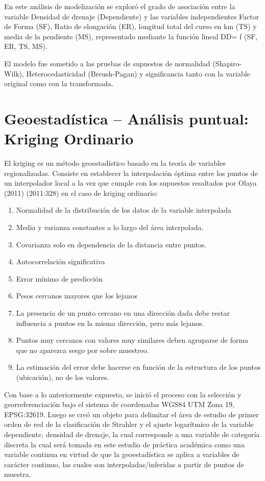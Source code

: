 \documentclass[11pt,]{article}
\providecommand{\tightlist}{%
\setlength{\itemsep}{0pt}\setlength{\parskip}{0pt}}
\begin{document}
En este análisis de modelización se exploró el grado de asociación entre
la variable Densidad de drenaje (Dependiente) y las variables
independientes Factor de Forma (SF), Ratio de elongación (ER), longitud
total del curso en km (TS) y media de la pendiente (MS), representado
mediante la función lineal DD= f (SF, ER, TS, MS).

El modelo fue sometido a las pruebas de supuestos de normalidad
(Shapiro-Wilk), Heterocedasticidad (Breush-Pagan) y significancia tanto
con la variable original como con la transformada.

\section{Geoestadística -- Análisis puntual: Kriging
Ordinario}\label{geoestaduxedstica-anuxe1lisis-puntual-kriging-ordinario}

El kriging es un método geoestadístico basado en la teoría de variables
regionalizadas. Consiste en establecer la interpolación óptima entre los
puntos de un interpolador local a la vez que cumple con los supuestos
resaltados por Olaya (2011) (2011:328) en el caso de kriging ordinario:

\begin{enumerate}
\def\labelenumi{\arabic{enumi}.}
\tightlist
\item
  Normalidad de la distribución de los datos de la variable interpolada
\item
  Media y varianza constantes a lo largo del área interpolada.
\item
  Covarianza solo en dependencia de la distancia entre puntos.
\item
  Autocorrelación significativa
\item
  Error mínimo de predicción
\item
  Pesos cercanos mayores que los lejanos
\item
  La presencia de un punto cercano en una dirección dada debe restar
  influencia a puntos en la misma dirección, pero más lejanos.
\item
  Puntos muy cercanos con valores muy similares deben agruparse de forma
  que no aparezca sesgo por sobre muestreo.
\item
  La estimación del error debe hacerse en función de la estructura de
  los puntos (ubicación), no de los valores.
\end{enumerate}

Con base a lo anteriormente expuesto, se inició el proceso con la
selección y georreferenciación bajo el sistema de coordenadas WGS84 UTM
Zona 19, EPSG:32619. Luego se creó un objeto para delimitar el área de
estudio de primer orden de red de la clasificación de Strahler y el
ajuste logarítmico de la variable dependiente, densidad de drenaje, la
cual corresponde a una variable de categoría discreta la cual será
tomada en este estudio de práctica académica como una variable continua
en virtud de que la geoestadística se aplica a variables de carácter
continuo, las cuales son interpoladas/inferidas a partir de puntos de
muestra.
\end{document}
